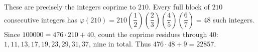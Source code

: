 These are precisely the integers coprime to $210$. Every full block of $210$ consecutive integers has $\varphi(210)=210(\dfrac{1}{2})(\dfrac{2}{3})(\dfrac{4}{5})(\dfrac{6}{7})=48$ such integers. Since $100000=476\cdot210+40$, count the coprime residues through $40$: $1,11,13,17,19,23,29,31,37$, nine in total. Thus $476\cdot48+9=\boxed{22857}$.
